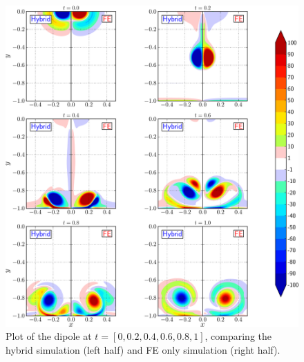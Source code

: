 	\begin{figure}[!p]
	\showthe\columnwidth
	\centering
	\includegraphics[width=\linewidth]{./figures/hybrid/cbColl/hybrid_doubleMonolope_contourfComparisonNew_compressed-crop.png}
	\caption{Plot of the dipole at $t = [0, 0.2, 0.4, 0.6, 0.8, 1]$, comparing the hybrid simulation (left half) and FE only simulation (right half).}
	\label{fig:hybrid_doubleMonolope_contourfComparison}
	\end{figure}

